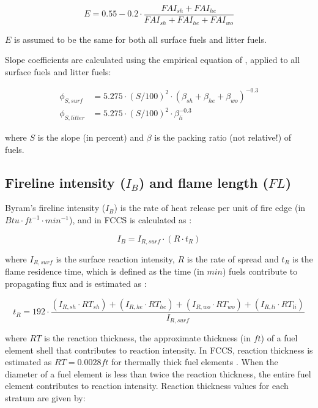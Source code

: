 \documentclass[]{book}
\begin{document}
\begin{equation}
E = 0.55 - 0.2 \cdot \frac{FAI_{sh}+FAI_{he}}{FAI_{sh}+FAI_{he}+FAI_{wo}}
\end{equation}

\(E\) is assumed to be the same for both all surface fuels and litter
fuels.

Slope coefficients are calculated using the empirical equation of
\citet{Rothermel1972}, applied to all surface fuels and litter fuels:

\begin{eqnarray}
\phi_{S, surf} &= 5.275 \cdot (S/100)^{2}\cdot (\beta_{sh}+\beta_{he}+\beta_{wo})^{-0.3}\\
\phi_{S, litter} &= 5.275 \cdot (S/100)^{2}\cdot \beta_{li}^{-0.3}
\end{eqnarray}

where \(S\) is the slope (in percent) and \(\beta\) is the packing ratio
(not relative!) of fuels.

\subsection{\texorpdfstring{Fireline intensity (\(I_B\)) and flame
length
(\(FL\))}{Fireline intensity (I\_B) and flame length (FL)}}\label{fireline-intensity-i_b-and-flame-length-fl}

Byram's fireline intensity (\(I_B\)) is the rate of heat release per
unit of fire edge (in \(Btu\cdot ft^{-1} \cdot min^{-1}\)), and in FCCS
is calculated as \citep{Albini1976}:

\begin{equation}
I_B = I_{R,surf} \cdot (R \cdot t_R)
\end{equation}

where \(I_{R,surf}\) is the surface reaction intensity, \(R\) is the
rate of spread and \(t_R\) is the flame residence time, which is defined
as the time (in \(min\)) fuels contribute to propagating flux and is
estimated as \citet{Albini1976}:

\begin{equation}
t_R = 192 \cdot \frac{(I_{R,sh}\cdot RT_{sh})+(I_{R,he}\cdot RT_{he})+(I_{R,wo}\cdot RT_{wo})+(I_{R,li}\cdot RT_{li})}{I_{R,surf}}
\end{equation}

where \(RT\) is the reaction thickness, the approximate thickness (in
\(ft\)) of a fuel element shell that contributes to reaction intensity.
In FCCS, reaction thickness is estimated as \(RT = 0.0028 ft\) for
thermally thick fuel elements \citep{Sandberg2007}. When the diameter of
a fuel element is less than twice the reaction thickness, the entire
fuel element contributes to reaction intensity. Reaction thickness
values for each stratum are given by:
\end{document}
